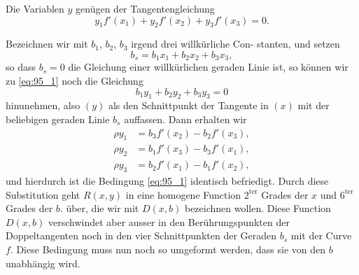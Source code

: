 \documentclass[12pt,a4paper]{article}
\theoremstyle{plain}
\theoremstyle{definition}
\theoremstyle{remark}
\begin{document}
Die Variablen $y$ genügen der Tangentengleichung
\begin{equation}\label{eq:95_1}
y_1 f'(x_1) + y_2 f'(x_2) + y_3 f'(x_3) = 0.
\end{equation}

Bezeichnen wir mit $b_1$, $b_2$, $b_3$ irgend drei willkürliche Con-
stanten, und setzen
\begin{equation}\label{eq:95_2}
b_s = b_1 x_1 + b_2 x_2 + b_3 x_3,
\end{equation}
so dass $b_s = 0$ die Gleichung einer willkürlichen geraden Linie ist,
so können wir zu \eqref{eq:95_1} noch die Gleichung
\begin{equation}\label{eq:95_3}
b_1 y_1 + b_2 y_2 + b_3 y_3 = 0
\end{equation}
hinunehmen, also $(y)$ als den Schnittpunkt der Tangente in $(x)$
mit der beliebigen geraden Linie $b_s$ auffassen. Dann erhalten wir
\begin{equation}\label{eq:95_4}
\begin{aligned}
\rho y_1 &= b_3 f'(x_2) - b_2 f'(x_3), \\
\rho y_2 &= b_1 f'(x_3) - b_3 f'(x_1), \\
\rho y_3 &= b_2 f'(x_1) - b_1 f'(x_2),
\end{aligned}
\end{equation}
und hierdurch ist die Bedingung \eqref{eq:95_1} identisch befriedigt. Durch
diese Substitution geht $R(x, y)$ in eine homogene Function
$2^{\text{ter}}$ Grades der $x$ und $6^{\text{ter}}$ Grades der $b$. über, die wir mit
$D(x, b)$ bezeichnen wollen. Diese Function $D(x, b)$ verschwindet
aber ausser in den Berührungspunkten der Doppeltangenten noch
in den vier Schnittpunkten der Geraden $b_s$ mit der Curve $f$.
Diese Bedingung muss nun noch so umgeformt werden, dass sie
von den $b$ unabhängig wird.
\end{document}
